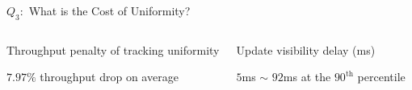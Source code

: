 \begin{frame}{$Q_{3}:$ What is the Cost of Uniformity?}
  \begin{columns}
    \begin{center}
      \vspace{-0.20cm}
      {\footnotesize Throughput penalty of tracking uniformity}

      \vspace{0.30cm}
      $7.97\%$ throughput drop on average
    \end{center}
    \pause
    \begin{center}
      \vspace{-0.20cm}
      {\footnotesize Update visibility delay (ms)}

      \vspace{0.30cm}
      $5$ms $\sim$ $92$ms at the $90^{\text{th}}$ percentile
    \end{center}
  \end{columns}
\end{frame}
